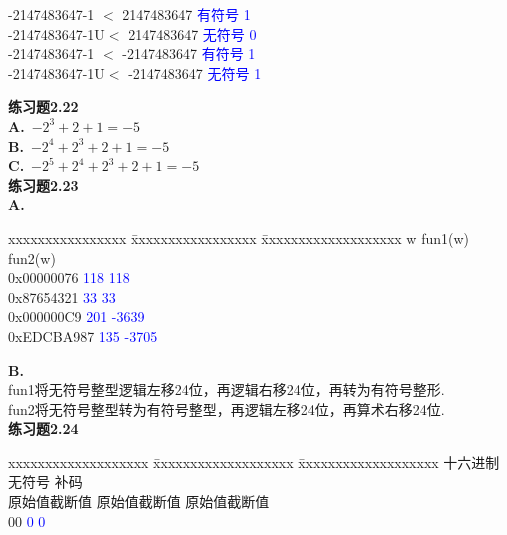 \documentclass{article}
\begin{document}
\begin{CJK}{UTF8}{uyhei}
\begin{tabbing}
	-2147483647-1 $<$  2147483647		\>	\textcolor{blue}{有符号}	\>	\textcolor{blue}1	\\
	-2147483647-1U$<$  2147483647		\>	\textcolor{blue}{无符号}	\>	\textcolor{blue}0	\\
	-2147483647-1 $<$  -2147483647		\>	\textcolor{blue}{有符号}	\>	\textcolor{blue}1	\\
	-2147483647-1U$<$  -2147483647		\>	\textcolor{blue}{无符号}	\>	\textcolor{blue}1	\\
\end{tabbing}
\textbf{练习题2.22}\\
\textbf{A.}\ $-2^{3}+2+1=-5$ \\
\textbf{B.}\ $-2^{4}+2^3+2+1=-5$ \\
\textbf{C.}\ $-2^5+2^4+2^3+2+1=-5$ \\[3ex]
\textbf{练习题2.23}\\
\textbf{A.}
\begin{tabbing}
	xxxxxxxxxxxxxxxx	\=	xxxxxxxxxxxxxxxxx	\=	xxxxxxxxxxxxxxxxxxx	\kill
	w			\>	fun1(w)			\>	fun2(w)		\\
	0x00000076		\>	\textcolor{blue}{118}	\>	\textcolor{blue}{118}	\\
	0x87654321		\>	\textcolor{blue}{33}	\>	\textcolor{blue}{33}	\\
	0x000000C9		\>	\textcolor{blue}{201}	\>	\textcolor{blue}{-3639}	\\
	0xEDCBA987		\>	\textcolor{blue}{135}	\>	\textcolor{blue}{-3705}	\\
\end{tabbing}
\clearpage
\noindent\textbf{B.}\\ 
fun1将无符号整型逻辑左移24位，再逻辑右移24位，再转为有符号整形.\\
fun2将无符号整型转为有符号整型，再逻辑左移24位，再算术右移24位.\\[3ex]
\textbf{练习题2.24}
\begin{tabbing}
	xxxxxxxxxxxxxxxxxxx	\=	xxxxxxxxxxxxxxxxxxx			\=	xxxxxxxxxxxxxxxxxxx	\kill
	\hspace{2em}十六进制	\>	\hspace{2.5em}无符号			\>	\hspace{3em}补码			\\
	原始值\hspace{2em}截断值\>	原始值\hspace{2em}截断值\>	原始值\hspace{2em}截断值\\[1ex]
	0\hspace{5em}0		\hspace{5em}\textcolor{blue}{0}	\hspace{5em}\textcolor{blue}{0}	\\

\end{tabbing}
\end{CJK}
\end{document}
